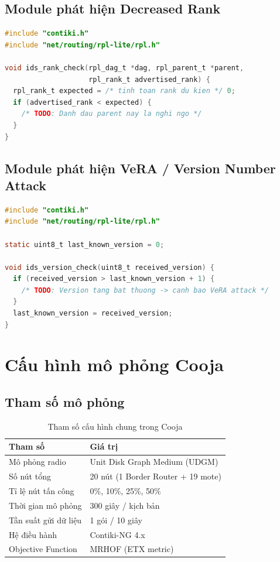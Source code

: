 \subsection{Module phát hiện Decreased Rank}

\begin{lstlisting}[language=C, caption={Skeleton: ids\_decreased\_rank.c}]
#include "contiki.h"
#include "net/routing/rpl-lite/rpl.h"

void ids_rank_check(rpl_dag_t *dag, rpl_parent_t *parent,
                    rpl_rank_t advertised_rank) {
  rpl_rank_t expected = /* tinh toan rank du kien */ 0;
  if (advertised_rank < expected) {
    /* TODO: Danh dau parent nay la nghi ngo */
  }
}
\end{lstlisting}

\subsection{Module phát hiện VeRA / Version Number Attack}

\begin{lstlisting}[language=C, caption={Skeleton: ids\_vera.c}]
#include "contiki.h"
#include "net/routing/rpl-lite/rpl.h"

static uint8_t last_known_version = 0;

void ids_version_check(uint8_t received_version) {
  if (received_version > last_known_version + 1) {
    /* TODO: Version tang bat thuong -> canh bao VeRA attack */
  }
  last_known_version = received_version;
}
\end{lstlisting}

\section{Cấu hình mô phỏng Cooja}
\label{app:cooja}

\subsection{Tham số mô phỏng}

\begin{table}[H]
\centering
\caption{Tham số cấu hình chung trong Cooja}
\begin{tabularx}{\textwidth}{lX}
  \toprule
  \textbf{Tham số} & \textbf{Giá trị} \\
  \midrule
  Mô phỏng radio    & Unit Disk Graph Medium (UDGM) \\
  Số nút tổng       & 20 nút (1 Border Router + 19 mote) \\
  Tỉ lệ nút tấn công & 0\%, 10\%, 25\%, 50\% \\
  Thời gian mô phỏng & 300 giây / kịch bản \\
  Tần suất gửi dữ liệu & 1 gói / 10 giây \\
  Hệ điều hành      & Contiki-NG 4.x \\
  Objective Function & MRHOF (ETX metric) \\
  \bottomrule
\end{tabularx}
\end{table}

